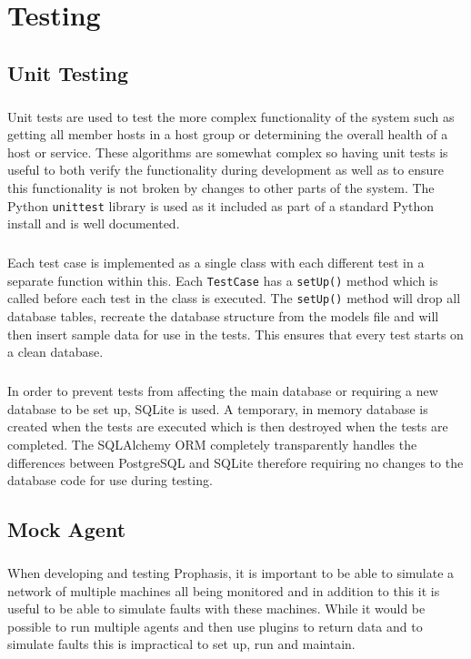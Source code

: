 \documentclass[bsc,logo,twoside,singlespacing]{infthesis}
\begin{document}
\chapter{Testing}
\section{Unit Testing}
\paragraph*{}
	Unit tests are used to test the more complex functionality of the system such
	as getting all member hosts in a host group or determining the overall health
	of a host or service.  These algorithms are somewhat complex so having unit
	tests is useful to both verify the functionality during development as well
	as to ensure this functionality is not broken by changes to other parts of the
	system.  The Python \texttt{unittest} library is used as it included as part of
	a standard Python install and is well documented.
	
\paragraph*{}
	Each test case is implemented as a single class with each different test in a
	separate function within this.  Each \texttt{TestCase} has a \texttt{setUp()}
	method which is called before each test in the class is executed.  The
	\texttt{setUp()} method will drop all database tables, recreate the database
	structure from the models file and will then insert sample data for use in the
	tests.  This ensures that every test starts on a clean database.
	
\paragraph*{}
	In order to prevent tests from affecting the main database or requiring a new
	database to be set up, SQLite is used.  A temporary, in memory database is
	created when the tests are executed which is then destroyed when the tests are
	completed.  The SQLAlchemy ORM completely transparently handles the differences
	between PostgreSQL and SQLite therefore requiring no changes to the database
	code for use during testing.
	
\section{Mock Agent}
\paragraph*{}
	When developing and testing Prophasis, it is important to be able to simulate a
	network of multiple machines all being monitored and in addition to this it
	is useful to be able to simulate faults with these machines. While it would be
	possible to run multiple agents and then use plugins to return data and to
	simulate faults this is impractical to set up, run and maintain.
	
\end{document}

